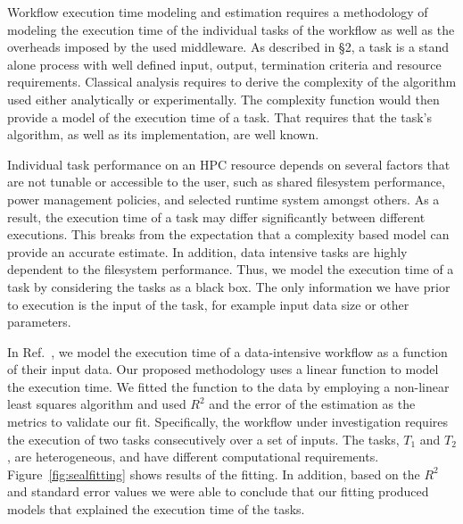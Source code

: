 \label{initial_res}
Workflow execution time modeling and estimation requires a methodology of 
modeling the execution time of the individual tasks of the workflow as well as 
the overheads imposed by the used middleware. As described in \S2, a task is a 
stand alone process with well defined input, output, termination criteria and 
resource requirements. Classical analysis requires to derive the complexity of 
the algorithm used either analytically or experimentally. The complexity 
function would then provide a model of the execution time of a task. That 
requires that the task's algorithm, as well as its implementation, are well 
known. 

Individual task performance on an HPC resource depends on several factors that 
are not tunable or accessible to the user, such as shared filesystem 
performance, power management policies, and selected runtime system amongst 
others. As a result, the execution time of a task may differ significantly 
between different executions. This breaks from the expectation that a complexity 
based model can provide an accurate estimate. In addition, data intensive tasks 
are highly dependent to the filesystem performance. Thus, we model the 
execution time of a task by considering the tasks as a black box. The only 
information we have prior to execution is the input of the task, for example 
input data size or other parameters.

In Ref.~\cite{paraskevakos2019workflow}, we model the execution time of a 
data-intensive workflow as a function of their input data. Our proposed 
methodology uses a linear function to model the execution time. We fitted the 
function to the data by employing a non-linear least squares algorithm and used 
$R^{2}$ and the error of the estimation as the metrics to validate our fit. 
Specifically, the workflow under investigation requires the execution of two 
tasks consecutively over a set of inputs. The tasks, $T_{1}$ and $T_{2}$, are 
heterogeneous, and have different computational requirements. 
Figure~\ref{fig:sealfitting} shows results of the fitting. In addition, based 
on the $R^{2}$ and standard error values we were able to conclude that our 
fitting produced models that explained the execution time of the tasks.


